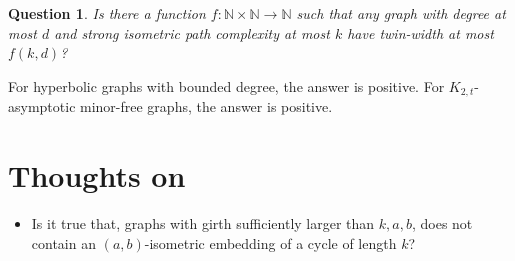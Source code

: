 \documentclass[a4paper]{article}
\newtheorem{Question}{Question}
\newtheorem{definition}{Definition}
\begin{document}
 
 
 
% 
% 
% 
 
 \begin{Question}
 	Is there a function $f\colon \mathbb{N}\times \mathbb{N} \rightarrow \mathbb{N}$ such that any graph with degree at most $d$ and strong isometric path complexity at most $k$ have twin-width at most $f(k,d)$?
 \end{Question} 
 
For hyperbolic graphs with bounded degree, the answer is positive. For $K_{2,t}$-asymptotic minor-free graphs, the answer is positive. 

\section{Thoughts on }

\begin{itemize}
	\item Is it true that, graphs with girth sufficiently larger than $k,a,b$, does not contain an $(a,b)$-isometric embedding of a cycle of length $k$?  
\end{itemize}
\end{document}
